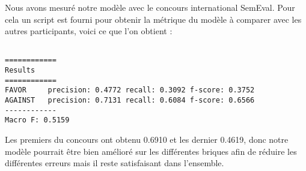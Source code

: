 \par Nous avons mesuré notre modèle avec le concours international SemEval. Pour cela un script est fourni pour obtenir la métrique du modèle à comparer avec les autres participants, voici ce que l'on obtient : \\

\begin{verbatim}

============
Results
============
FAVOR     precision: 0.4772 recall: 0.3092 f-score: 0.3752
AGAINST   precision: 0.7131 recall: 0.6084 f-score: 0.6566
------------
Macro F: 0.5159
\end{verbatim}

\par Les premiers du concours ont obtenu 0.6910 et les dernier 0.4619, donc notre modèle pourrait être bien amélioré sur les différentes briques afin de réduire les différentes erreurs mais il reste satisfaisant dans l'ensemble. 